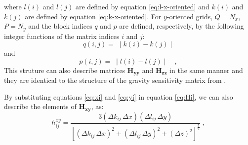 where $l(i)$ and $l(j)$ are defined by equation \ref{eq:l-x-oriented} 
and $k(i)$ and $k(j)$ are defined by equation \ref{eq:k-x-oriented}.
For $y$-oriented grids, $Q = N_{x}$, $P = N_{y}$ and the block indices
$q$ and $p$ are defined, respectively, by the following integer functions 
of the matrix indices $i$ and $j$:
\begin{equation}
q(i, j) = \; \mid k(i) - k(j) \mid 
\label{eq:Hxx-q-y-oriented}
\end{equation}
and
\begin{equation}
p(i, j) = \; \mid l(i) - l(j) \mid \quad ,
\label{eq:Hxx-p-y-oriented}
\end{equation}
This struture can also describe matrices $\mathbf{H_{yy}}$ and $\mathbf{H_{zz}}$ in the same manner and they are identical to the structure of the gravity sensitivity matrix from \cite{takahashi2020convolutional}.


By substituting equations \ref{eq:xi} and \ref{eq:yi} in equation \ref{eq:Hi}, we can also describe the elements of $\mathbf{H_{xy}}$, as:
\begin{equation}
h^{xy}_{ij} = \frac{3 (\Delta k_{ij} \, \Delta x )(\Delta l_{ij} \, \Delta y )}{\left[ 
	\left( \Delta k_{ij} \, \Delta x \right)^{2} + 
	\left( \Delta l_{ij} \, \Delta y \right)^{2} + 
	\left( \Delta z \right)^{2} \right]^{\frac{5}{2}}} \: ,
\label{eq:hxy_mag}
\end{equation}

